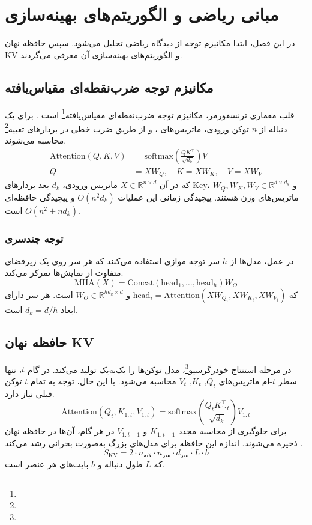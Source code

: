 \chapter{مبانی ریاضی و الگوریتم‌های بهینه‌سازی}
\label{chap:methods}

در این فصل، ابتدا مکانیزم توجه از دیدگاه ریاضی تحلیل می‌شود. سپس حافظه نهان KV و الگوریتم‌های بهینه‌سازی آن معرفی می‌گردند.

\section{مکانیزم توجه ضرب‌نقطه‌ای مقیاس‌یافته}
قلب معماری ترنسفورمر، مکانیزم توجه ضرب‌نقطه‌ای مقیاس‌یافته\footnote{} است \cite{vaswani2017attention}. برای یک دنباله از $n$ توکن ورودی، ماتریس‌های ،  و  از طریق ضرب خطی در بردارهای تعبیه\footnote{} محاسبه می‌شوند.
\begin{align}
\label{eq:attention}
\text{Attention}(Q, K, V) &= \text{softmax}\left(\frac{Q K^\top}{\sqrt{d_k}}\right) V \\[4pt]
Q &= X W_Q,\quad K = X W_K,\quad V = X W_V
\end{align}
که در آن $X \in \mathbb{R}^{n \times d}$ ماتریس ورودی، $d_k$ بعد بردارهای Key، و $W_Q, W_K, W_V \in \mathbb{R}^{d \times d_k}$ ماتریس‌های وزن هستند. پیچیدگی زمانی این عملیات $O(n^2 d_k)$ و پیچیدگی حافظه‌ای $O(n^2 + n d_k)$ است.

\subsection{توجه چندسری}
در عمل، مدل‌ها از $h$ سر توجه موازی استفاده می‌کنند که هر سر روی یک زیرفضای متفاوت از نمایش‌ها تمرکز می‌کند.
\begin{equation}
\label{eq:mha}
\text{MHA}(X) = \text{Concat}(\text{head}_1, \ldots, \text{head}_h) W_O
\end{equation}
که $\text{head}_i = \text{Attention}(X W_{Q_i}, X W_{K_i}, X W_{V_i})$ و $W_O \in \mathbb{R}^{h d_k \times d}$ است. هر سر دارای ابعاد $d_k = d/h$ است.

\section{حافظه نهان KV}
در مرحله استنتاج خودرگرسیو\footnote{}، مدل توکن‌ها را یک‌به‌یک تولید می‌کند. در گام $t$، تنها سطر $t$-ام ماتریس‌های $Q_t$, $K_t$, $V_t$ محاسبه می‌شود. با این حال، توجه به تمام $t$ توکن قبلی نیاز دارد.
\begin{equation}
\label{eq:kv_cache}
\text{Attention}(Q_t, K_{1:t}, V_{1:t}) = \text{softmax}\left(\frac{Q_t K_{1:t}^\top}{\sqrt{d_k}}\right) V_{1:t}
\end{equation}
برای جلوگیری از محاسبه مجدد $K_{1:t-1}$ و $V_{1:t-1}$ در هر گام، آن‌ها در حافظه نهان ذخیره می‌شوند. اندازه این حافظه برای مدل‌های بزرگ به‌صورت بحرانی رشد می‌کند \cite{pope2023efficiently}.
\begin{equation}
\label{eq:kv_growth}
S_{\text{KV}} = 2 \cdot n_{\text{لایه}} \cdot n_{\text{سر}} \cdot d_{\text{سر}} \cdot L \cdot b
\end{equation}
که $L$ طول دنباله و $b$ بایت‌های هر عنصر است.

